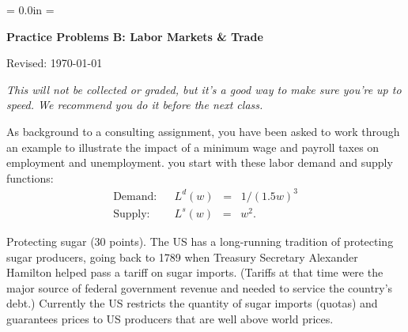 \documentclass[12pt]{exam}
\def\HeadName{Practice Problems B}
\begin{document}
\parindent = 0.0in
\parskip = \bigskipamount
\thispagestyle{empty}%
\Head

\centerline{\large \bf \HeadName:  Labor Markets \& Trade}
\centerline{Revised:  \today}

\medskip
{\it This will not be collected or graded, 
but it's a good way to make sure you're up to speed.
We recommend you do it before the next class.}

\begin{questions}
\question As background to a consulting assignment, 
you have been asked to work through an example to illustrate
the impact of a minimum wage and payroll taxes on employment and unemployment.  
you start with these labor demand and supply functions:  
\begin{eqnarray*}
    \mbox{Demand:} && L^d(w) \;\;=\;\; 1/(1.5 w)^3 \\
    \mbox{Supply:} && L^s(w) \;\;=\;\; w^2 .
\end{eqnarray*}
%

\question Protecting sugar (30 points).
The US has a long-running tradition of protecting sugar producers, 
going back to 1789 when Treasury Secretary Alexander Hamilton helped
pass a tariff on sugar imports.  
(Tariffs at that time were the major source of federal government revenue
and needed to service the country's debt.) 
Currently the US restricts the quantity of sugar imports (quotas) and guarantees
prices to US producers that are well above world prices.  


\end{questions}
\end{document}
